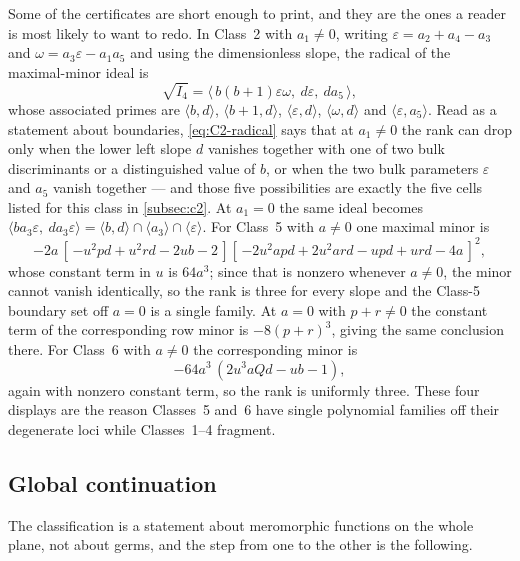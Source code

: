 \documentclass[11pt,reqno]{amsart}
\theoremstyle{plain}
\theoremstyle{definition}
\theoremstyle{remark}
\numberwithin{equation}{section}
\begin{document}
Some of the certificates are short enough to print, and they are the ones a
reader is most likely to want to redo. In Class~2 with $a_1\ne0$, writing
$\varepsilon=a_2+a_4-a_3$ and $\omega=a_3\varepsilon-a_1a_5$ and using the
dimensionless slope, the radical of the maximal-minor ideal is
\begin{equation}
\sqrt{I_4}=\langle\, b(b+1)\varepsilon\omega,\ d\varepsilon,\ da_5\,\rangle,
\label{eq:C2-radical}
\end{equation}
whose associated primes are $\langle b,d\rangle$, $\langle b+1,d\rangle$,
$\langle\varepsilon,d\rangle$, $\langle\omega,d\rangle$ and
$\langle\varepsilon,a_5\rangle$. Read as a statement about boundaries,
\cref{eq:C2-radical} says that at $a_1\ne0$ the rank can drop only when the lower
left slope $d$ vanishes together with one of two bulk discriminants or a
distinguished value of $b$, or when the two bulk parameters $\varepsilon$ and
$a_5$ vanish together --- and those five possibilities are exactly the five cells listed for this class in
\cref{subsec:c2}. At $a_1=0$ the same ideal becomes
$\langle ba_3\varepsilon,\ da_3\varepsilon\rangle
=\langle b,d\rangle\cap\langle a_3\rangle\cap\langle\varepsilon\rangle$.
For Class~5 with $a\ne0$ one maximal minor is
\begin{equation}
-2a\,[\,{-u^2pd+u^2rd-2ub-2}\,]
[\,{-2u^2apd+2u^2ard-upd+urd-4a}\,]^2,
\label{eq:C5-minor}
\end{equation}
whose constant term in $u$ is $64a^3$; since that is nonzero whenever $a\ne0$,
the minor cannot vanish identically, so the rank is three for every slope and the
Class-5 boundary set off $a=0$ is a single family. At $a=0$ with $p+r\ne0$ the
constant term of the corresponding row minor is $-8(p+r)^3$, giving the same
conclusion there. For Class~6 with $a\ne0$ the corresponding minor is
\begin{equation}
-64a^3\,(2u^3aQd-ub-1),
\label{eq:C6-minor}
\end{equation}
again with nonzero constant term, so the rank is uniformly three. These four
displays are the reason Classes~5 and~6 have single polynomial families off their
degenerate loci while Classes~1--4 fragment.

\subsection{Global continuation}
\label{subsec:continuation}

The classification is a statement about meromorphic functions on the whole plane,
not about germs, and the step from one to the other is the following.
\end{document}
